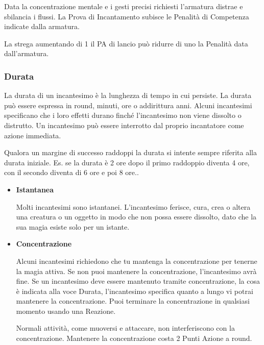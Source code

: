 \documentclass[12pt,a4paper,twoside,openany]{book}
\begin{document}
\begin{multicols}{2}
Data la concentrazione mentale e i gesti precisi richiesti l'armatura distrae e sbilancia i flussi. La Prova di Incantamento subisce le Penalità di Competenza indicate dalla armatura.

La strega aumentando di 1 il PA di lancio può ridurre di uno la Penalità data dall'armatura.

\subsubsection{Durata}\label{magiedurata}

La durata di un incantesimo è la lunghezza di tempo in cui persiste. La durata può essere espressa in round, minuti, ore o addirittura anni. Alcuni incantesimi specificano che i loro effetti durano finché l'incantesimo non viene dissolto o distrutto. Un incantesimo può essere interrotto dal proprio incantatore come azione immediata.

Qualora un margine di successo raddoppi la durata si intente sempre riferita alla durata iniziale. Es. se la durata è 2 ore dopo il primo raddoppio diventa 4 ore, con il secondo diventa di 6 ore e poi 8 ore..

\begin{itemize}
	
\item
\textbf{Istantanea}
	
Molti incantesimi sono istantanei. L'incantesimo ferisce, cura, crea o altera una creatura o un oggetto in modo che non possa essere dissolto, dato che la sua magia esiste solo per un istante.
	
\item
	
\textbf{Concentrazione}
	
Alcuni incantesimi richiedono che tu mantenga la concentrazione per tenerne la magia attiva. Se non puoi mantenere la concentrazione, l'incantesimo avrà fine. Se un incantesimo deve essere mantenuto tramite concentrazione, la cosa è indicata alla voce Durata, l'incantesimo specifica quanto a lungo vi potrai mantenere la concentrazione. Puoi terminare la concentrazione in qualsiasi momento usando una Reazione.
	
Normali attività, come muoversi e attaccare, non interferiscono con la concentrazione. Mantenere la concentrazione costa 2 Punti Azione a round.


\end{itemize}
\end{multicols}
\end{document}
